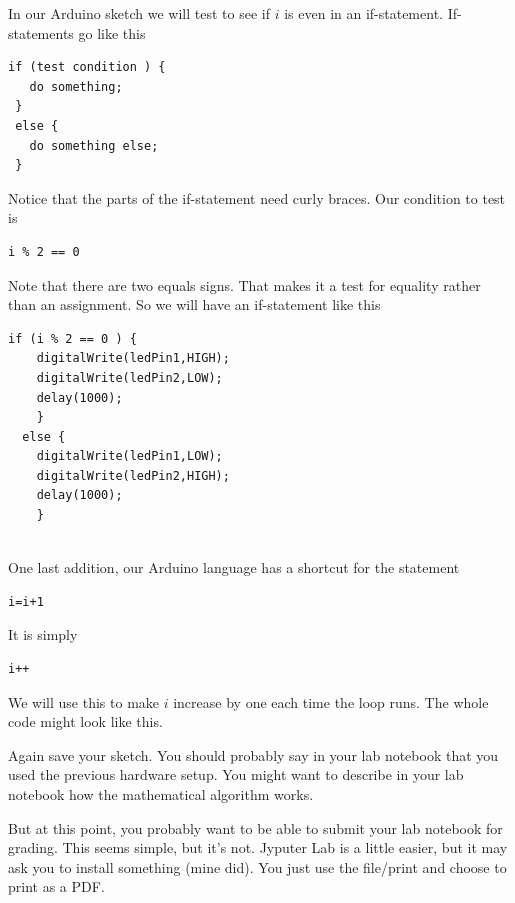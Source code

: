 In our Arduino sketch we will test to see if $i$ is even in an if-statement. If-statements go like this 

\begin{lstlisting}[language=Arduino]
 if (test condition ) {
   do something;
 }
 else {
   do something else;
 }
\end{lstlisting}

Notice that the parts of the if-statement need curly braces. Our condition to test is

\begin{lstlisting}[language=Arduino]
  i % 2 == 0
\end{lstlisting}

Note that there are two equals signs. That makes it a test for equality rather than an assignment. So we will have an if-statement like this

 \begin{lstlisting}[language=Arduino]
  if (i % 2 == 0 ) {
    digitalWrite(ledPin1,HIGH);
    digitalWrite(ledPin2,LOW);
    delay(1000);
    }
  else {
    digitalWrite(ledPin1,LOW);
    digitalWrite(ledPin2,HIGH);
    delay(1000);
    }
 
 \end{lstlisting}

One last addition, our Arduino language has a shortcut for the statement

\begin{lstlisting}[language=Arduino]
  i=i+1
\end{lstlisting}

It is simply

\begin{lstlisting}[language=Arduino]
  i++
\end{lstlisting}

We will use this to make $i$ increase by one each time the loop runs. The whole code might look like this.



Again save your sketch. You should probably say in your lab notebook that
you used the previous hardware setup. You might want to describe in your lab
notebook how the mathematical algorithm works.

But at this point, you probably want to be able to submit your lab notebook for grading. This seems simple, but it's not. Jyputer Lab is a little easier, but it may ask you to install something (mine did). You just use the file/print and choose to print as a PDF. 

